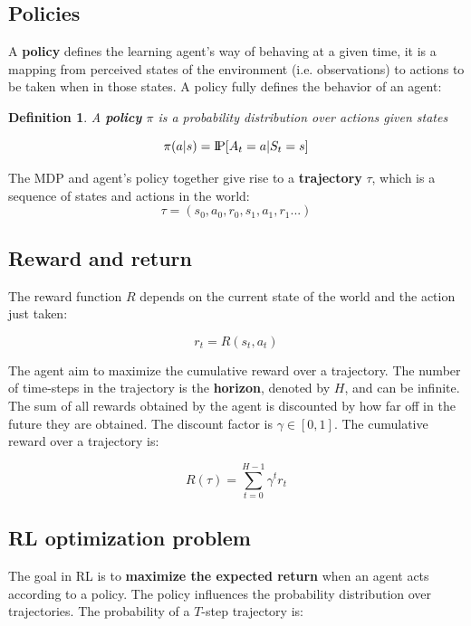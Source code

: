 \documentclass{article}
\newtheorem{definition}{Definition}
\newcommand{\Pprob}{\text{I\kern-0.15em P}}
\begin{document}
\subsection{Policies}
A \textbf{policy} defines the learning agent's way of behaving at a given time, it is a mapping from perceived states of the environment (i.e. observations) to actions to be taken when in those states. A policy fully defines the behavior of an agent:

\begin{definition}
	 A \textbf{policy} $\pi$ is a probability distribution over actions given states
	
	\begin{equation}
	\pi(a | s) = \Pprob[A_t=a|S_t=s]
	\end{equation}

\end{definition}

The MDP and agent's policy together give rise to a \textbf{trajectory} $\tau$, which is a sequence of states and actions in the world:
$$\tau = (s_0, a_0, r_0, s_1, a_1, r_1...)$$


\subsection{Reward and return}
The reward function $R$ depends on the current state of the world and the action just taken:

$$r_t = R(s_t, a_t)$$

The agent aim to maximize the cumulative reward over a trajectory. The number of time-steps in the trajectory is the \textbf{horizon}, denoted by $H$, and can be infinite. The sum of all rewards obtained by the agent is discounted by how far off in the future they are obtained. The discount factor is $\gamma \in [0,1]$. The cumulative reward over a trajectory is:

\begin{equation}
R(\tau) = \sum_{t=0}^{H-1} \gamma^t r_t
\end{equation}

\subsection{RL optimization problem}
The goal in RL is to \textbf{maximize the expected return} when an agent acts according to a policy. The policy influences the probability distribution over trajectories. The probability of a $T$-step trajectory is:
\end{document}
